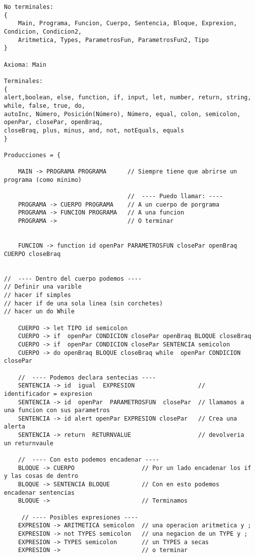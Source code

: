 \documentclass{article}
\begin{document}
\begin{verbatim}
No terminales:
{
    Main, Programa, Funcion, Cuerpo, Sentencia, Bloque, Exprexion, Condicion, Condicion2,
    Aritmetica, Types, ParametrosFun, ParametrosFun2, Tipo
}

Axioma: Main

Terminales:
{
alert,boolean, else, function, if, input, let, number, return, string, while, false, true, do,
autoInc, Número, Posición(Número), Número, equal, colon, semicolon, openPar, closePar, openBraq,
closeBraq, plus, minus, and, not, notEquals, equals
}

Producciones = {

    MAIN -> PROGRAMA PROGRAMA      // Siempre tiene que abrirse un programa (como minimo) 
    
                                   //  ---- Puedo llamar: ----
    PROGRAMA -> CUERPO PROGRAMA    // A un cuerpo de porgrama
    PROGRAMA -> FUNCION PROGRAMA   // A una funcion  
    PROGRAMA ->                    // O terminar


    FUNCION -> function id openPar PARAMETROSFUN closePar openBraq  CUERPO closeBraq 


//  ---- Dentro del cuerpo podemos ---- 
// Definir una varible
// hacer if simples
// hacer if de una sola linea (sin corchetes)
// hacer un do While 

    CUERPO -> let TIPO id semicolon                                            
    CUERPO -> if  openPar CONDICION closePar openBraq BLOQUE closeBraq         
    CUERPO -> if  openPar CONDICION closePar SENTENCIA semicolon               
    CUERPO -> do openBraq BLOQUE closeBraq while  openPar CONDICION  closePar              
    
    //  ---- Podemos declara sentecias ---- 
    SENTENCIA -> id  igual  EXPRESION                  // identificador = expresion 
    SENTENCIA -> id  openPar  PARAMETROSFUN  closePar  // llamamos a una funcion con sus parametros
    SENTENCIA -> id alert openPar EXPRESION closePar   // Crea una alerta 
    SENTENCIA -> return  RETURNVALUE                   // devolveria un returnvaule
    
    //  ---- Con esto podemos encadenar ----
    BLOQUE -> CUERPO                   // Por un lado encadenar los if y las cosas de dentro
    BLOQUE -> SENTENCIA BLOQUE         // Con en esto podemos encadenar sentencias
    BLOQUE ->                          // Terminamos 
    
     // ---- Posibles expresiones ----
    EXPRESION -> ARITMETICA semicolon  // una operacion aritmetica y ;
    EXPRESION -> not TYPES semicolon   // una negacion de un TYPE y ; 
    EXPRESION -> TYPES semicolon       // un TYPES a secas
    EXPRESION ->                       // o terminar


\end{verbatim}
\end{document}
